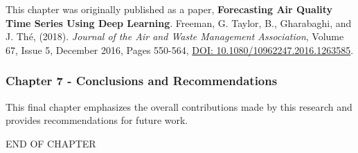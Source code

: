 This chapter was originally published as a paper, \textbf{Forecasting Air Quality Time Series Using Deep Learning}. Freeman, G. Taylor, B., Gharabaghi, and J.  Th\'e, (2018).  \textit{Journal of the Air and Waste Management Association}, Volume 67, Issue 5, December 2016, Pages 550-564, \url{DOI: 10.1080/10962247.2016.1263585}.

\subsubsection*{Chapter 7 - Conclusions and Recommendations }

This final chapter emphasizes the overall contributions made by this research and provides recommendations for future work. 


\bigskip
\begin{center}
END OF CHAPTER
\end{center}
